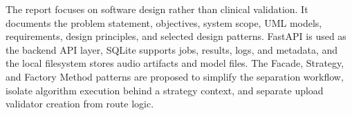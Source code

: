 \documentclass[12pt,a4paper]{report}
\begin{document}
The report focuses on software design rather than clinical validation. It documents the problem statement, objectives, system scope, UML models, requirements, design principles, and selected design patterns. FastAPI is used as the backend API layer, SQLite supports jobs, results, logs, and metadata, and the local filesystem stores audio artifacts and model files. The Facade, Strategy, and Factory Method patterns are proposed to simplify the separation workflow, isolate algorithm execution behind a strategy context, and separate upload validator creation from route logic.

\clearpage
{}







\begingroup
\sloppy
\printbibliography[heading=bibintoc,title={Bibliography / References}]
\endgroup
\end{document}
